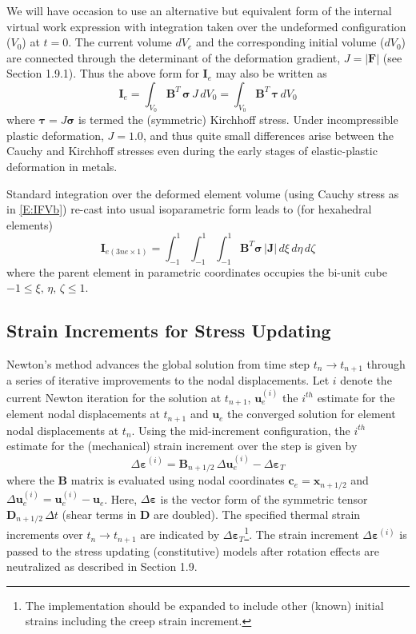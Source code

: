\documentclass[11pt]{report}
\numberwithin{equation}{section}
\newcommand{\bmf } {\boldsymbol }  %
\newcommand{\nid}{\noindent}
\newcommand{\vareps}{\varepsilon}
\begin{document}
We will have occasion to use an alternative but equivalent form of the internal
virtual work expression with integration taken over the undeformed
configuration ($V_0$) at $t=0$. The current volume $dV_e$ and the corresponding initial
volume  ($dV_0$) are connected through the determinant of the
deformation gradient, $J=|\mathbf{F}|$ (see Section 1.9.1). Thus the above form for
$\bmf{I}_e$ may also be written as
%
\begin{equation}\label{E:IFVb-1}
\bmf{I}_e =
 \int_{V_0} \mathbf{B}^T\, \bmf{\sigma}\, J \, dV_0  =\int_{V_0} \mathbf{B}^T\, \bmf{\tau} \, dV_0
\end{equation}
%
\nid where $\bmf{\tau}= J \bmf{\sigma}$ is termed the (symmetric) Kirchhoff stress. Under 
incompressible plastic deformation, $J=1.0$, and thus quite small differences
arise between the Cauchy and Kirchhoff stresses even during the early stages of elastic-plastic
deformation in metals.

Standard integration over the deformed element volume (using Cauchy stress as in \ref{E:IFVb})
 re-cast into usual
isoparametric form leads to (for hexahedral elements)
%
\begin{equation}\label{E:IFVc}
 \bmf{I}_{e(3ne\times1)}= \int_{-1}^{1} \int_{-1}^{1} \int_{-1}^{1} 
 \mathbf{B}^T \bmf{\sigma}\, |\mathbf{J}| \, d\xi\, d\eta \,d\zeta 
\end{equation}
\nid where the parent element in parametric coordinates occupies the bi-unit
cube $-1 \le \xi, \, \eta,\, \zeta\le 1$.
%

\subsection{Strain Increments for Stress Updating}
\nid Newton's method advances the global solution from time step 
$t_n \rightarrow t_{n+1}$ through a series of
iterative improvements to the nodal displacements. Let $i$ denote the current Newton iteration
for the solution at $t_{n+1}$, $\bmf{u}_e^{(i)}$ the $i^{th}$ estimate for the element nodal 
displacements at $t_{n+1}$ and $\bmf{u}_e$ the converged solution for element 
nodal displacements at $t_n$. Using the mid-increment configuration, 
the $i^{th}$ estimate for the (mechanical) strain increment over the step is given by
%
\begin{equation}\label{E:SIa}
\Delta \bmf{\vareps}^{(i)}= \mathbf {B}_{n + 1/2}\, \Delta \bmf{u}_e^{(i)} - \Delta \bmf{\vareps}_{T}
\end{equation}
%
\nid 
where the $\mathbf{B}$ matrix is evaluated using nodal coordinates 
$\bmf{c}_e = \bmf{x}_{n+1/2}$ and $\Delta \bmf{u}_e^{(i)} =\bmf{u}_e^{(i)} - \bmf{u}_e$.
Here, $\Delta \bmf{\vareps}$ is the vector form of the symmetric 
tensor $\mathbf{D}_{n+1/2}\,\Delta t$ (shear terms in $\mathbf{D}$ are doubled).
The specified thermal strain increments 
over $t_n \rightarrow t_{n+1}$
are indicated by $\Delta \bmf{\vareps}_T$\footnote{The
implementation should be expanded to include
other (known) initial strains including the creep
strain increment.}. The strain increment $\Delta \bmf{\vareps}^{(i)}$
 is passed to the stress updating (constitutive) models 
after rotation effects are neutralized
as described in Section 1.9.
\end{document}
